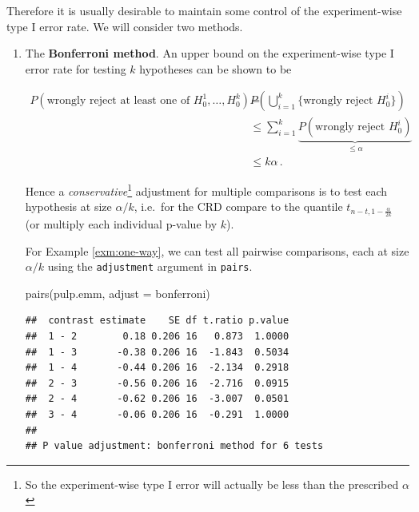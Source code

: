 \documentclass[
]{book}
\newenvironment{Shaded}{\begin{snugshade}}{\end{snugshade}}
\newcommand{\AttributeTok}[1]{\textcolor[rgb]{0.77,0.63,0.00}{#1}}
\newcommand{\FunctionTok}[1]{\textcolor[rgb]{0.00,0.00,0.00}{#1}}
\newcommand{\NormalTok}[1]{#1}
\newcommand{\StringTok}[1]{\textcolor[rgb]{0.31,0.60,0.02}{#1}}
\theoremstyle{definition}
\theoremstyle{definition}
\theoremstyle{definition}
\theoremstyle{definition}
\theoremstyle{remark}
\begin{document}
Therefore it is usually desirable to maintain some control of the experiment-wise type I error rate. We will consider two methods.

\begin{enumerate}
\def\labelenumi{\arabic{enumi}.}
\item
  The \textbf{Bonferroni method}. An upper bound on the experiment-wise type I error rate for testing \(k\) hypotheses can be shown to be

  \begin{align*}
  P(\mbox{wrongly reject at least one of } H_{0}^1, \ldots, H_{0}^k) = &    P\left(\bigcup_{i=1}^{k}\{\mbox{wrongly reject } H_{0}^i\}\right) \\
  & \leq \sum_{i=1}^{k}\underbrace{P(\mbox{wrongly reject } H_{0}^i)}_{\leq \alpha} \\ 
  & \leq k\alpha\,.
  \end{align*}

  Hence a \emph{conservative}\footnote{So the experiment-wise type I error will actually be less than the prescribed \(\alpha\)} adjustment for multiple comparisons is to test each hypothesis at size \(\alpha / k\), i.e.~for the CRD compare to the quantile \(t_{n-t, 1-\frac{\alpha}{2k}}\) (or multiply each individual p-value by \(k\)).

  For Example \ref{exm:one-way}, we can test all pairwise comparisons, each at size \(\alpha/k\) using the \texttt{adjustment} argument in \texttt{pairs}.

\begin{Shaded}
\begin{Highlighting}[]
\FunctionTok{pairs}\NormalTok{(pulp.emm, }\AttributeTok{adjust =} \StringTok{\textquotesingle{}bonferroni\textquotesingle{}}\NormalTok{)}
\end{Highlighting}
\end{Shaded}

\begin{verbatim}
##  contrast estimate    SE df t.ratio p.value
##  1 - 2        0.18 0.206 16   0.873  1.0000
##  1 - 3       -0.38 0.206 16  -1.843  0.5034
##  1 - 4       -0.44 0.206 16  -2.134  0.2918
##  2 - 3       -0.56 0.206 16  -2.716  0.0915
##  2 - 4       -0.62 0.206 16  -3.007  0.0501
##  3 - 4       -0.06 0.206 16  -0.291  1.0000
## 
## P value adjustment: bonferroni method for 6 tests
\end{verbatim}


\end{enumerate}
\end{document}

